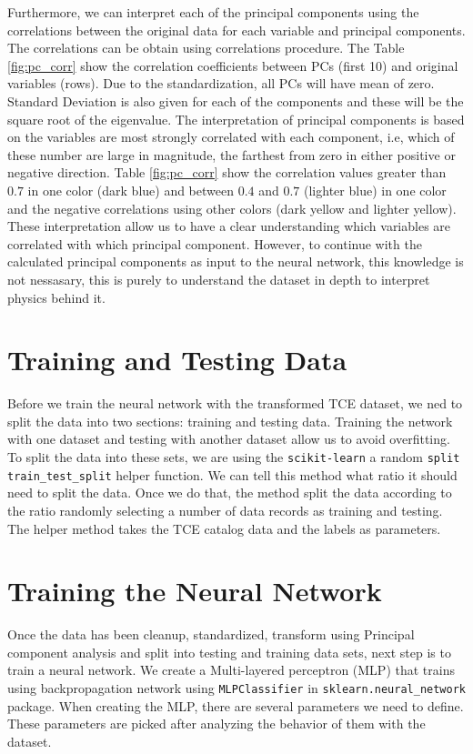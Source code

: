 Furthermore, we can interpret each of the principal components using the correlations between the original data for each variable and principal components. The correlations can be obtain using correlations procedure. The Table \ref{fig:pc_corr} show the correlation coefficients between PCs (first 10) and original variables (rows). Due to the standardization, all PCs will have mean of zero. Standard Deviation is also given for each of the components and these will be the square root of the eigenvalue. The interpretation of principal components is based on the variables are most strongly correlated with each component, i.e, which of these number are large in magnitude, the farthest from zero in either positive or negative direction. Table \ref{fig:pc_corr} show the correlation values greater than $0.7$ in one color (dark blue) and between $0.4$ and $0.7$ (lighter blue) in one color and the negative correlations using other colors (dark yellow and lighter yellow). These interpretation allow us to have a clear understanding which variables are correlated with which principal component. However, to continue with the calculated principal components as input to the neural network, this knowledge is not nessasary, this is purely to understand the dataset in depth to interpret physics behind it.

\section{Training and Testing Data}
Before we train the neural network with the transformed TCE dataset, we ned to split the data into two sections: training and testing data. Training the network with one dataset and testing with another dataset allow us to avoid overfitting. To split the data into these sets, we are using the \texttt{scikit-learn} a random \texttt{split train\_test\_split} helper function. We can tell this method what ratio it should need to split the data. Once we do that, the method split the data according to the ratio randomly selecting a number of data records as training and testing. The helper method takes the TCE catalog data and the labels as parameters. 

\section{Training the Neural Network}
Once the data has been cleanup, standardized, transform using Principal component analysis and split into testing and training data sets, next step is to train a neural network. We create a Multi-layered perceptron (MLP) that trains using backpropagation network using  \texttt{MLPClassifier} in  \texttt{sklearn.neural\_network} package. When creating the MLP, there are several parameters we need to define. These parameters are picked after analyzing the behavior of them with the dataset. 

